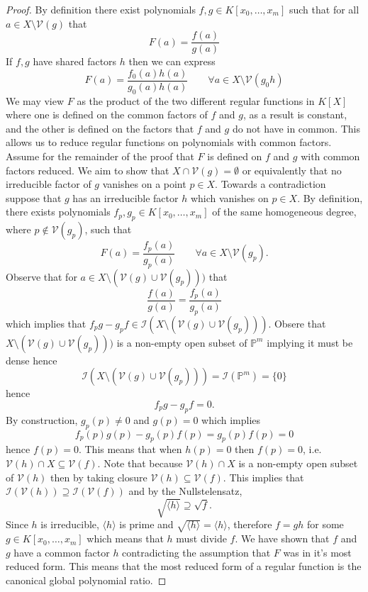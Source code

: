 \documentclass[40pt]{article}
\newcommand{\Proj}{\mathbb{P}}
\newcommand{\I}{\mathcal{I}}
\newcommand{\V}{\mathcal{V}}
\newcommand{\la}{\langle}
\newcommand{\ra}{\rangle}
\theoremstyle{remark}
\begin{document}
				\begin{proof}
					By definition there exist polynomials $f,g \in K[x_0,\dots,x_m]$ such that for all $a \in X \setminus \V(g)$ that 
					\[
					F(a) = \frac{f(a)}{g(a)}
					\]
					If $f,g$ have shared factors $h$ then we can express 
					\[
					F(a) = \frac{f_0(a)h(a)}{g_0(a)h(a)} \quad\quad \forall a \in X \setminus \V(g_0h)
					\]
					We may view $F$ as the product of the two different regular functions in $K[X]$ where one is defined on the common factors of $f$ and $g$, as a result is constant, and the other is defined on the factors that $f$ and $g$ do not have in common. This allows us to reduce regular functions on polynomials with common factors. Assume for the remainder of the proof that $F$ is defined on $f$ and $g$ with  common factors reduced. We aim to show that $X \cap \V(g) = \emptyset$ or equivalently that no irreducible factor of $g$ vanishes on a point $p \in X$. Towards a contradiction suppose that $g$ has an irreducible factor $h$ which vanishes on $p \in X$. By definition, there exists polynomials $f_p,g_p \in K[x_0,\dots,x_m]$ of the same homogeneous degree, where $p \not \in \V(g_p)$, such that 
					\[
					F(a) = \frac{f_p(a)}{g_p(a)} \quad\quad \forall a \in X \setminus \V(g_p).
					\]
					Observe that for $a \in X \setminus (\V(g) \cup \V(g_p)))$ that 
					\[
					\frac{f(a)}{g(a)} = \frac{f_p(a)}{g_p(a)}
					\]
					which implies that $f_pg - g_pf \in \I(X \setminus (\V(g) \cup \V(g_p)))$. Obsere that $X \setminus (\V(g) \cup \V(g_p)))$ is a non-empty open subset of $\Proj^m$ implying it must be dense hence 
					\[
					\I(X \setminus (\V(g) \cup \V(g_p))) = \I(\Proj^m) = \{0\}
					\]
					hence 
					\[
					f_pg - g_pf = 0.
					\]
					By construction, $g_p(p) \neq 0$ and $g(p) = 0$ which implies 
					\[
					f_p(p)g(p) - g_p(p)f(p) = g_p(p)f(p) = 0
					\]
					hence $f(p) = 0$. This means that when $h(p) = 0$ then $f(p) = 0$, i.e. $\V(h) \cap X \subseteq \V(f)$. Note that because $\V(h) \cap X$ is a non-empty open subset of $\V(h)$ then by taking closure $\V(h) \subseteq \V(f)$. This implies that $\I(\V(h)) \supseteq \I(\V(f))$ and by the Nullstelensatz, 
					\[
					\sqrt{\la h \ra} \supseteq \sqrt{f}.
					\]
					Since $h$ is irreducible, $\la h \ra$ is prime and $\sqrt{\la h \ra} = \la h \ra$, therefore $f = gh$ for some $g \in K[x_0,\dots,x_m]$ which means that $h$ must divide $f$. We have shown that $f$ and $g$ have a common factor $h$ contradicting the assumption that $F$ was in it's most reduced form. This means that the most reduced form of a regular function is the canonical global polynomial ratio. 
				\end{proof}
\end{document}
